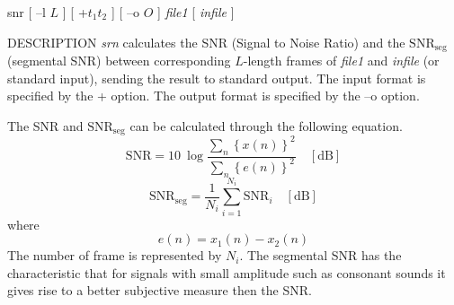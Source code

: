 \begin{synopsis}
\item [snr] [ --l $L$ ] [ +$t_1 t_2$ ] [ --o $O$ ] {\em file1} [ {\em infile} ] 
\end{synopsis}

\begin{qsection}{DESCRIPTION}
{\em srn} calculates the SNR (Signal to Noise Ratio) 
and the $\mathrm{SNR}_{\mathrm{seg}}$ (segmental SNR) 
between corresponding $L$-length frames
of {\em file1} and {\em infile} (or standard input), 
sending the result to standard output.
The input format is specified by the + option.
The output format is specified by the --o option.

The SNR and $\mathrm{SNR}_{\mathrm{seg}}$ can be calculated
through the following equation.
\begin{displaymath}
\mathrm{SNR} = 10~\log \frac{\displaystyle\sum_{n} \left\{ x(n) \right\}^{2}}
{\displaystyle\sum_{n} \left\{ e(n) \right\}^{2}} \quad \mathrm{[dB]}
\end{displaymath}
\begin{displaymath}
\mathrm{SNR}_{\mathrm{seg}} = \frac{1}{N_{i}} \sum_{i = 1}^{N_{i}}
\mathrm{SNR}_{i} \quad \mathrm{[dB]}
\end{displaymath}
where
\begin{displaymath}
e(n) = x_1(n) - x_2(n)
\end{displaymath}
The number of frame is represented by $N_i$.
The segmental SNR has the characteristic that
for signals with small amplitude such as consonant sounds
it gives rise to a better
subjective measure then the SNR.
\end{qsection}

